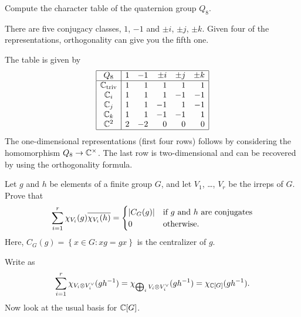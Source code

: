 \begin{problem}
	[Quaternions]
	Compute the character table of the quaternion group $Q_8$.
	\begin{hint}
		There are five conjugacy classes, $1$, $-1$
		and $\pm i$, $\pm j$, $\pm k$.
		Given four of the representations, orthogonality
		can give you the fifth one.
	\end{hint}
	\begin{sol}
		The table is given by
		\[
			\begin{array}{|c|rrrrr|}
				\hline
				Q_8 & 1 & -1 & \pm i & \pm j & \pm k \\ \hline
				\mathbb C_{\mathrm{triv}} & 1 & 1 & 1 & 1 & 1 \\
				\mathbb C_i & 1 & 1 & 1 & -1 & -1 \\
				\mathbb C_j & 1 & 1 & -1 & 1 & -1 \\
				\mathbb C_k & 1 & 1 & -1 & -1 & 1 \\
				\mathbb C^2 & 2 & -2 & 0 & 0 & 0 \\\hline
			\end{array}
		\]
		The one-dimensional representations (first four rows)
		follows by considering the homomorphism $Q_8 \to \mathbb C^\times$.
		The last row is two-dimensional and can be recovered
		by using the orthogonality formula.
	\end{sol}
\end{problem}

\begin{sproblem}
	\label{prob:second_orthog}
	\gim
	Let $g$ and $h$ be elements of a finite group $G$,
	and let $V_1$, \dots, $V_r$ be the irreps of $G$.
	Prove that
	\[
		\sum_{i = 1}^r \chi_{V_i}(g) \overline{\chi_{V_i}(h)}
		=
		\begin{cases}
			|C_G(g)| & \text{if $g$ and $h$ are conjugates} \\
			0 & \text{otherwise}.
		\end{cases}
	\]
	Here, $C_G(g) = \left\{ x \in G : xg = gx \right\}$
	is the centralizer of $g$.
	\begin{hint}
		Write as
		\[ \sum_{i=1}^r \chi_{V_i \otimes V_i^\vee} (gh^{-1})
			= \chi_{\bigoplus_i V_i \otimes V_i^\vee}(gh^{-1})
			= \chi_{\mathbb C[G]}(gh^{-1}).
		\]
		Now look at the usual basis for $\mathbb C[G]$.
	\end{hint}
\end{sproblem}
